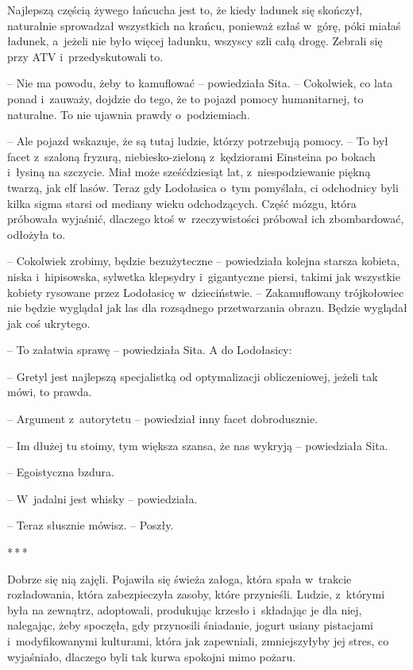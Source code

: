 \documentclass[oneside,polish,11pt,sfheadings]{mwbk}
\newcommand{\threeast}{\bigskip\par\centerline{*\,*\,*}\medskip\par}
\begin{document}
Najlepszą częścią żywego łańcucha jest to, że kiedy ładunek się
skończył, naturalnie sprowadzał wszystkich na krańcu, ponieważ szłaś w~górę, póki miałaś ładunek, a~jeżeli nie było więcej ładunku, wszyscy
szli całą drogę. Zebrali się przy ATV i~przedyskutowali to.

-- Nie ma powodu, żeby to kamuflować -- powiedziała Sita. -- Cokolwiek, co
lata ponad i~zauważy, dojdzie do tego, że to pojazd pomocy humanitarnej,
to naturalne. To nie ujawnia prawdy o~podziemiach.

-- Ale pojazd wskazuje, że są tutaj ludzie, którzy potrzebują pomocy. -- To był facet z~szaloną fryzurą, niebiesko-zieloną z~kędziorami Einsteina
po bokach i~łysiną na szczycie. Miał może sześćdziesiąt lat, z~niespodziewanie piękną twarzą, jak elf lasów. Teraz gdy Lodołasica o~tym
pomyślała, ci odchodnicy byli kilka sigma starsi od mediany wieku
odchodzących. Część mózgu, która próbowała wyjaśnić, dlaczego ktoś w~rzeczywistości próbował ich zbombardować, odłożyła to.

-- Cokolwiek zrobimy, będzie bezużyteczne -- powiedziała kolejna starsza
kobieta, niska i~hipisowska, sylwetka klepsydry i~gigantyczne piersi,
takimi jak wszystkie kobiety rysowane przez Lodołasicę w~dzieciństwie. -- Zakamuflowany trójkołowiec nie będzie wyglądał jak las dla rozsądnego
przetwarzania obrazu. Będzie wyglądał jak coś ukrytego.

-- To załatwia sprawę -- powiedziała Sita. A do Lodołasicy: 

-- Gretyl jest
najlepszą specjalistką od optymalizacji obliczeniowej, jeżeli tak mówi,
to prawda.

-- Argument z~autorytetu -- powiedział inny facet dobrodusznie.

-- Im dłużej tu stoimy, tym większa szansa, że nas wykryją -- powiedziała
Sita.

-- Egoistyczna bzdura.

-- W~jadalni jest whisky -- powiedziała.

-- Teraz słusznie mówisz. -- Poszły.

\threeast

Dobrze się nią zajęli. Pojawiła się świeża załoga, która spała w~trakcie
rozładowania, która zabezpieczyła zasoby, które przynieśli. Ludzie, z~którymi była na zewnątrz, adoptowali, produkując krzesło i~składając je
dla niej, nalegając, żeby spoczęła, gdy przynosili śniadanie, jogurt
usiany pistacjami i~modyfikowanymi kulturami, która jak zapewniali,
zmniejszyłyby jej stres, co wyjaśniało, dlaczego byli tak kurwa spokojni
mimo pożaru.
\end{document}
